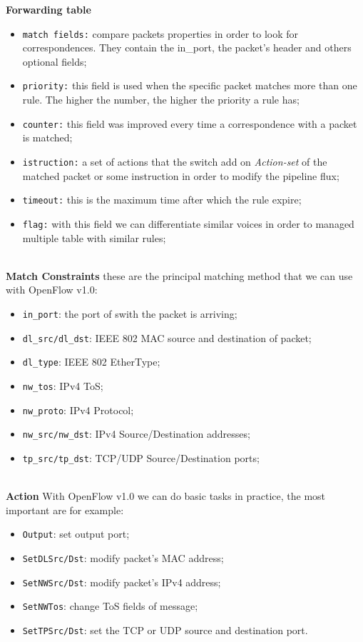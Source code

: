 \documentclass[article,10pt]{IEEEtran}
\begin{document}
\textbf{Forwarding table}
\begin{itemize}
 \item \texttt{match fields:} compare packets properties in order to look for correspondences. They contain the in_port, the packet's header and others optional fields;
 \item \texttt{priority:} this field is used when the specific packet matches more than one rule. The higher the number, the higher the priority a rule has;
 \item \texttt{counter:} this field was improved every time a correspondence with a packet is matched;
 \item \texttt{istruction:} a set of actions that the switch add on \emph{Action-set} of the matched packet or some instruction 
 in order to modify the pipeline flux;
 \item \texttt{timeout:} this is the maximum time after which the rule expire;
 \item \texttt{flag:} with this field we can differentiate similar voices in order to managed multiple table with similar rules;
 \\
 \\
\end{itemize}

\textbf{Match Constraints}
these are the principal matching method that we can use with OpenFlow v1.0:
\begin{itemize}
 \item \texttt{in_port}: the port of swith the packet is arriving;
 \item \texttt{dl_src/dl_dst}: IEEE 802 MAC source and destination of packet;
 \item \texttt{dl_type}: IEEE 802 EtherType;
 \item \texttt{nw_tos}: IPv4 ToS;
 \item \texttt{nw_proto}: IPv4 Protocol;
 \item \texttt{nw_src/nw_dst}: IPv4 Source/Destination addresses;
 \item \texttt{tp_src/tp_dst}: TCP/UDP Source/Destination ports;
 \\
 \\
\end{itemize}

\textbf{Action} With OpenFlow v1.0 we can do basic tasks in practice, the most important are for example:
\begin{itemize}
 \item \texttt{Output}: set output port;
 \item \texttt{SetDLSrc/Dst}: modify packet's MAC address;
 \item \texttt{SetNWSrc/Dst}: modify packet's IPv4 address;
 \item \texttt{SetNWTos}: change ToS fields of message;
 \item \texttt{SetTPSrc/Dst}: set the TCP or UDP source and destination port.
\end{itemize}
\end{document}
